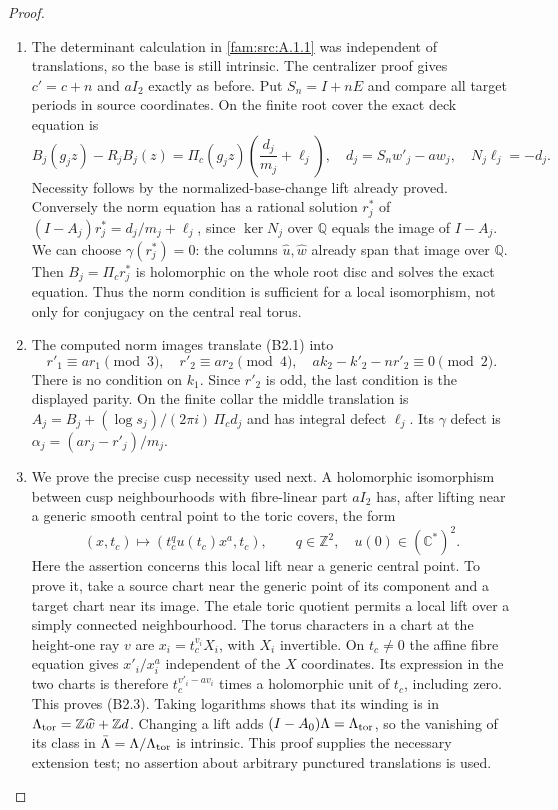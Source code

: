\begin{proof}
\begin{enumerate}[label=\arabic*.,leftmargin=*]
\item The determinant calculation in \ref{fam:src:A.1.1} was independent of translations, so the base is still intrinsic. The centralizer proof gives $c'=c+n$ and $aI_2$ exactly as before. Put $S_n=I+nE$ and compare all target periods in source coordinates. On the finite root cover the exact deck equation is
\[
 B_j(g_jz)-R_jB_j(z)=\Pi_c(g_jz)\left(\frac{d_j}{m_j}+\ell_j\right),
 \quad d_j=S_nw'_j-a w_j,
 \quad N_j\ell_j=-d_j.                                      \tag{B2.1}
\]
Necessity follows by the normalized-base-change lift already proved. Conversely the norm equation has a rational solution $r_j^*$ of
$(I-A_j)r_j^*=d_j/m_j+\ell_j$, since $\ker N_j$ over $\mathbb Q$ equals the image of $I-A_j$. We can choose $\gamma(r_j^*)=0$: the columns $\widehat u,\widehat w$ already span that image over $\mathbb Q$. Then $B_j=\Pi_cr_j^*$ is holomorphic on the whole root disc and solves the exact equation. Thus the norm condition is sufficient for a local isomorphism, not only for conjugacy on the central real torus.

\item The computed norm images translate (B2.1) into
\[
 r'_1\equiv ar_1\pmod3,\quad r'_2\equiv ar_2\pmod4,
 \quad ak_2-k'_2-nr'_2\equiv0\pmod2.                       \tag{B2.2}
\]
There is no condition on $k_1$. Since $r'_2$ is odd, the last condition is the displayed parity. On the finite collar the middle translation is
$A_j=B_j+(\log s_j)/(2\pi i)\,\Pi_cd_j$ and has integral defect $\ell_j$. Its $\gamma$ defect is
$\alpha_j=(ar_j-r'_j)/m_j$.

\item We prove the precise cusp necessity used next. A holomorphic isomorphism between cusp neighbourhoods with fibre-linear part $aI_2$ has, after lifting near a generic smooth central point to the toric covers, the form
\[
 (x,t_c)\longmapsto(t_c^q u(t_c)x^a,t_c),\qquad q\in\mathbb Z^2,
 \quad u(0)\in(\mathbb C^*)^2.                           \tag{B2.3}
\]
Here the assertion concerns this local lift near a generic central point. To prove it, take a source chart near the generic point of its component and a target chart near its image. The etale toric quotient permits a local lift over a simply connected neighbourhood. The torus characters in a chart at the height-one ray $v$ are $x_i=t_c^{v_i}X_i$, with $X_i$ invertible. On $t_c\ne0$ the affine fibre equation gives $x'_i/x_i^a$ independent of the $X$ coordinates. Its expression in the two charts is therefore $t_c^{v'_i-av_i}$ times a holomorphic unit of $t_c$, including zero. This proves (B2.3). Taking logarithms shows that its winding is in $\Lambda_{\rm tor}=\mathbb Z\widehat w+\mathbb Zd$. Changing a lift adds $(I-A_0)\Lambda=\Lambda_{\rm tor}$, so the vanishing of its class in $\bar\Lambda=\Lambda/\Lambda_{\rm tor}$ is intrinsic. This proof supplies the necessary extension test; no assertion about arbitrary punctured translations is used.


\end{enumerate}
\end{proof}
